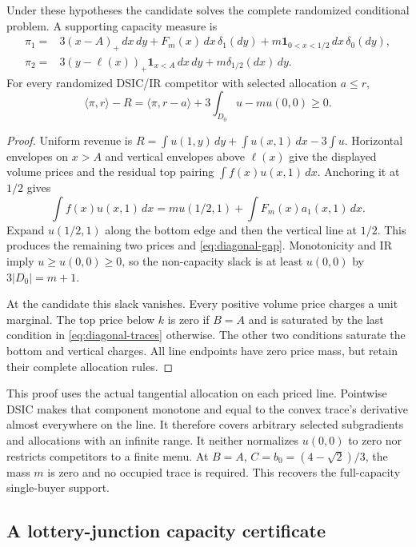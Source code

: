 \begin{theorem}\label{thm:diagonal}
Under these hypotheses the candidate solves the complete randomized
conditional problem. A supporting capacity measure is
\[
\begin{aligned}
\pi_1={}&3(x-A)_+\,dx\,dy+F_m(x)\,dx\,\delta_1(dy)
                +m\mathbf1_{0<x<1/2}\,dx\,\delta_0(dy),\\
\pi_2={}&3(y-\ell(x))_+\mathbf1_{x<A}\,dx\,dy
                +m\delta_{1/2}(dx)\,dy.
\end{aligned}
\]
For every randomized DSIC/IR competitor with selected allocation $a\le r$,
\begin{equation}\label{eq:diagonal-gap}
\langle\pi,r\rangle-R
 =\langle\pi,r-a\rangle+3\int_{D_0}u-mu(0,0)\ge0.
\end{equation}
\end{theorem}
\begin{proof}
Uniform revenue is
$R=\int u(1,y)\,dy+\int u(x,1)\,dx-3\int u$.
Horizontal envelopes on $x>A$ and vertical envelopes above $\ell(x)$
give the displayed volume prices and the residual top pairing
$\int f(x)u(x,1)\,dx$. Anchoring it at $1/2$ gives
\[
\int f(x)u(x,1)\,dx
 =mu(1/2,1)+\int F_m(x)a_1(x,1)\,dx.
\]
Expand $u(1/2,1)$ along the bottom edge and then the vertical line at $1/2$.
This produces the remaining two prices and \eqref{eq:diagonal-gap}.
Monotonicity and IR imply $u\ge u(0,0)\ge0$, so the non-capacity slack is
at least $u(0,0)$ by $3|D_0|=m+1$.

At the candidate this slack vanishes. Every positive volume price charges a
unit marginal. The top price below $k$ is zero if $B=A$ and is saturated by
the last condition in \eqref{eq:diagonal-traces} otherwise. The other two
conditions saturate the bottom and vertical charges. All line endpoints
have zero price mass, but retain their complete allocation rules.
\end{proof}

This proof uses the actual tangential allocation on each priced line.
Pointwise DSIC makes that component monotone and equal to the convex trace's
derivative almost everywhere on the line. It therefore covers arbitrary
selected subgradients and allocations with an infinite range. It neither
normalizes $u(0,0)$ to zero nor restricts competitors to a finite menu.
At $B=A$, $C=b_0=(4-\sqrt2)/3$, the mass $m$ is zero and no occupied
trace is required. This recovers the full-capacity single-buyer support.

\subsection{A lottery-junction capacity certificate}\label{sec:lottery-support}

